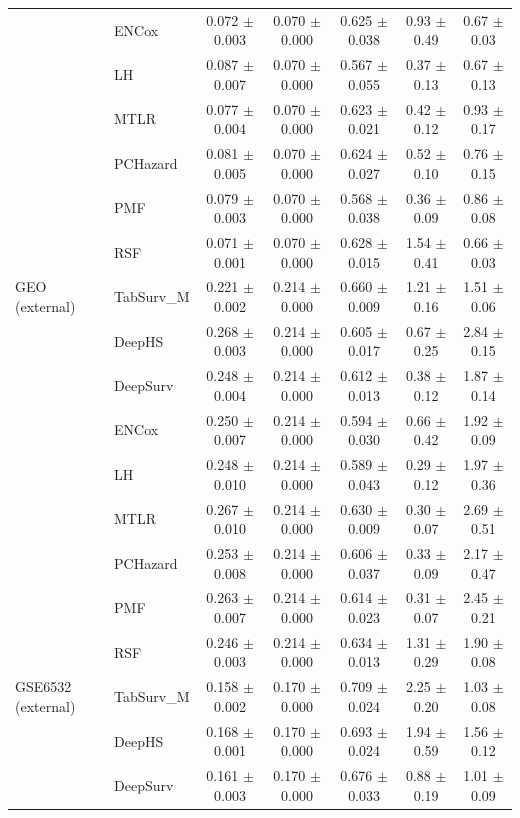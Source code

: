 \begin{longtable}{llccccc}
 & ENCox & 0.072 $\pm$ 0.003 & 0.070 $\pm$ 0.000 & 0.625 $\pm$ 0.038 & 0.93 $\pm$ 0.49 & 0.67 $\pm$ 0.03 \\
 & LH & 0.087 $\pm$ 0.007 & 0.070 $\pm$ 0.000 & 0.567 $\pm$ 0.055 & 0.37 $\pm$ 0.13 & 0.67 $\pm$ 0.13 \\
 & MTLR & 0.077 $\pm$ 0.004 & 0.070 $\pm$ 0.000 & 0.623 $\pm$ 0.021 & 0.42 $\pm$ 0.12 & 0.93 $\pm$ 0.17 \\
 & PCHazard & 0.081 $\pm$ 0.005 & 0.070 $\pm$ 0.000 & 0.624 $\pm$ 0.027 & 0.52 $\pm$ 0.10 & 0.76 $\pm$ 0.15 \\
 & PMF & 0.079 $\pm$ 0.003 & 0.070 $\pm$ 0.000 & 0.568 $\pm$ 0.038 & 0.36 $\pm$ 0.09 & 0.86 $\pm$ 0.08 \\
 & RSF & 0.071 $\pm$ 0.001 & 0.070 $\pm$ 0.000 & 0.628 $\pm$ 0.015 & 1.54 $\pm$ 0.41 & 0.66 $\pm$ 0.03 \\
\midrule
GEO (external) & TabSurv\_M & 0.221 $\pm$ 0.002 & 0.214 $\pm$ 0.000 & 0.660 $\pm$ 0.009 & 1.21 $\pm$ 0.16 & 1.51 $\pm$ 0.06 \\
 & DeepHS & 0.268 $\pm$ 0.003 & 0.214 $\pm$ 0.000 & 0.605 $\pm$ 0.017 & 0.67 $\pm$ 0.25 & 2.84 $\pm$ 0.15 \\
 & DeepSurv & 0.248 $\pm$ 0.004 & 0.214 $\pm$ 0.000 & 0.612 $\pm$ 0.013 & 0.38 $\pm$ 0.12 & 1.87 $\pm$ 0.14 \\
 & ENCox & 0.250 $\pm$ 0.007 & 0.214 $\pm$ 0.000 & 0.594 $\pm$ 0.030 & 0.66 $\pm$ 0.42 & 1.92 $\pm$ 0.09 \\
 & LH & 0.248 $\pm$ 0.010 & 0.214 $\pm$ 0.000 & 0.589 $\pm$ 0.043 & 0.29 $\pm$ 0.12 & 1.97 $\pm$ 0.36 \\
 & MTLR & 0.267 $\pm$ 0.010 & 0.214 $\pm$ 0.000 & 0.630 $\pm$ 0.009 & 0.30 $\pm$ 0.07 & 2.69 $\pm$ 0.51 \\
 & PCHazard & 0.253 $\pm$ 0.008 & 0.214 $\pm$ 0.000 & 0.606 $\pm$ 0.037 & 0.33 $\pm$ 0.09 & 2.17 $\pm$ 0.47 \\
 & PMF & 0.263 $\pm$ 0.007 & 0.214 $\pm$ 0.000 & 0.614 $\pm$ 0.023 & 0.31 $\pm$ 0.07 & 2.45 $\pm$ 0.21 \\
 & RSF & 0.246 $\pm$ 0.003 & 0.214 $\pm$ 0.000 & 0.634 $\pm$ 0.013 & 1.31 $\pm$ 0.29 & 1.90 $\pm$ 0.08 \\
\midrule
GSE6532 (external) & TabSurv\_M & 0.158 $\pm$ 0.002 & 0.170 $\pm$ 0.000 & 0.709 $\pm$ 0.024 & 2.25 $\pm$ 0.20 & 1.03 $\pm$ 0.08 \\
 & DeepHS & 0.168 $\pm$ 0.001 & 0.170 $\pm$ 0.000 & 0.693 $\pm$ 0.024 & 1.94 $\pm$ 0.59 & 1.56 $\pm$ 0.12 \\
 & DeepSurv & 0.161 $\pm$ 0.003 & 0.170 $\pm$ 0.000 & 0.676 $\pm$ 0.033 & 0.88 $\pm$ 0.19 & 1.01 $\pm$ 0.09 \\

\end{longtable}

